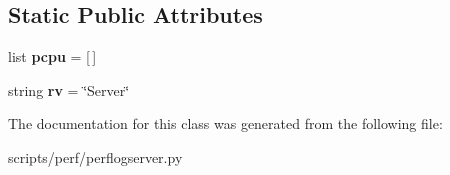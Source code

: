 \subsection*{Static Public Attributes}
\begin{DoxyCompactItemize}
\item 
\hypertarget{classperflogserver_1_1_server_metrics_a29b9a5982a0da39677af31fe66394abe}{list {\bfseries pcpu} = \mbox{[}$\,$\mbox{]}}\label{classperflogserver_1_1_server_metrics_a29b9a5982a0da39677af31fe66394abe}

\item 
\hypertarget{classperflogserver_1_1_server_metrics_aae4f237ee2f130715166a3002b267e40}{string {\bfseries rv} = \char`\"{}Server\char`\"{}}\label{classperflogserver_1_1_server_metrics_aae4f237ee2f130715166a3002b267e40}

\end{DoxyCompactItemize}


The documentation for this class was generated from the following file\+:\begin{DoxyCompactItemize}
\item 
scripts/perf/perflogserver.\+py\end{DoxyCompactItemize}
